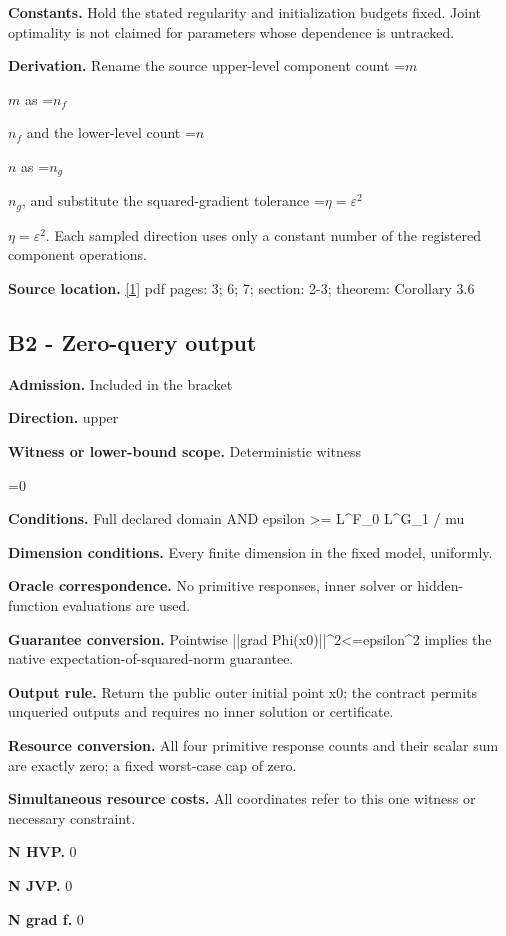\documentclass[10pt,a4paper]{article}
\newcommand{\AtlasMath}[1]{\par\begingroup\centering\setbox0=\hbox{$\displaystyle #1$}\ifdim\wd0>1.4\linewidth\typeout{ATLAS WIDE FORMULA: \the\wd0}\fi\ifdim\wd0>\linewidth\resizebox{\linewidth}{!}{\box0}\else\box0\fi\par\endgroup}
\newcommand{\AtlasInlineMath}[1]{\begingroup\setbox0=\hbox{$#1$}\ifdim\wd0>.4\linewidth\endgroup\AtlasMath{#1}\else\endgroup$#1$\fi}
\begin{document}
\textbf{Constants.} Hold the stated regularity and initialization budgets fixed. Joint optimality is not claimed for parameters whose dependence is untracked.

\textbf{Derivation.} Rename the source upper-level component count \AtlasInlineMath{m} as \AtlasInlineMath{n_f} and the lower-level count \AtlasInlineMath{n} as \AtlasInlineMath{n_g}, and substitute the squared-gradient tolerance \AtlasInlineMath{\eta=\varepsilon^2}. Each sampled direction uses only a constant number of the registered component operations.

\textbf{Source location.} \href{https://proceedings.mlr.press/v238/dagreou24a/dagreou24a.pdf}{[1]} pdf pages: 3; 6; 7; section: 2-3; theorem: Corollary 3.6

\subsection{B2 - Zero-query output}
\textbf{Admission.} Included in the bracket

\textbf{Direction.} upper

\textbf{Witness or lower-bound scope.} Deterministic witness

\AtlasMath{0}
\textbf{Conditions.} Full declared domain AND epsilon >= L\textasciicircum{}F\_\allowbreak{}0 L\textasciicircum{}G\_\allowbreak{}1 / mu

\textbf{Dimension conditions.} Every finite dimension in the fixed model, uniformly.

\textbf{Oracle correspondence.} No primitive responses, inner solver or hidden-function evaluations are used.

\textbf{Guarantee conversion.} Pointwise ||grad Phi(x0)||\textasciicircum{}2<=epsilon\textasciicircum{}2 implies the native expectation-of-squared-norm guarantee.

\textbf{Output rule.} Return the public outer initial point x0; the contract permits unqueried outputs and requires no inner solution or certificate.

\textbf{Resource conversion.} All four primitive response counts and their scalar sum are exactly zero; a fixed worst-case cap of zero.

\textbf{Simultaneous resource costs.} All coordinates refer to this one witness or necessary constraint.

\textbf{N HVP.} 0

\textbf{N JVP.} 0

\textbf{N grad f.} 0
\end{document}
